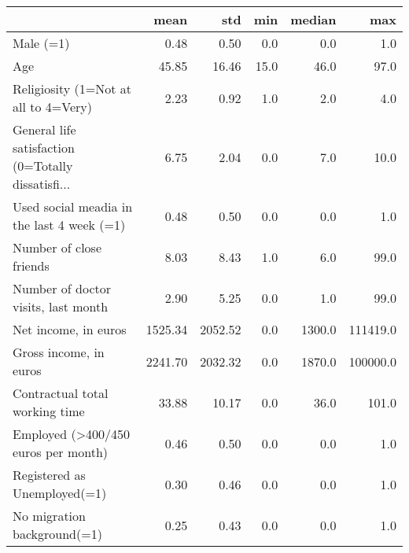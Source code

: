 \begin{tabular}{lrrrrr}
\toprule
{} &     mean &      std &   min &  median &       max \\
\midrule
Male (=1)                                          &     0.48 &     0.50 &   0.0 &     0.0 &       1.0 \\
Age                                                &    45.85 &    16.46 &  15.0 &    46.0 &      97.0 \\
Religiosity (1=Not at all to 4=Very)               &     2.23 &     0.92 &   1.0 &     2.0 &       4.0 \\
General life satisfaction (0=Totally dissatisfi... &     6.75 &     2.04 &   0.0 &     7.0 &      10.0 \\
Used social meadia in the last 4 week (=1)         &     0.48 &     0.50 &   0.0 &     0.0 &       1.0 \\
Number of close friends                            &     8.03 &     8.43 &   1.0 &     6.0 &      99.0 \\
Number of doctor visits, last month                &     2.90 &     5.25 &   0.0 &     1.0 &      99.0 \\
Net income, in euros                               &  1525.34 &  2052.52 &   0.0 &  1300.0 &  111419.0 \\
Gross income, in euros                             &  2241.70 &  2032.32 &   0.0 &  1870.0 &  100000.0 \\
Contractual total working time                     &    33.88 &    10.17 &   0.0 &    36.0 &     101.0 \\
Employed (>400/450 euros per month)                &     0.46 &     0.50 &   0.0 &     0.0 &       1.0 \\
Registered as Unemployed(=1)                       &     0.30 &     0.46 &   0.0 &     0.0 &       1.0 \\
No migration background(=1)                        &     0.25 &     0.43 &   0.0 &     0.0 &       1.0 \\
\bottomrule
\end{tabular}
